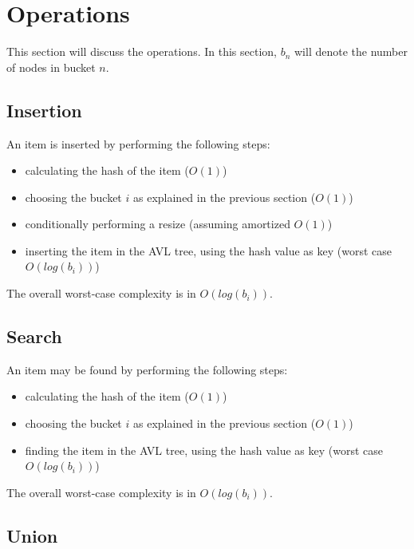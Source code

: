 \section{Operations}

    This section will discuss the operations.
    In this section, $b_n$ will denote the number of nodes in bucket $n$.

    \subsection{Insertion}

        An item is inserted by performing the following steps:
        \begin{itemize}
            \item calculating the hash of the item ($O(1)$)
            \item choosing the bucket $i$ as explained in the previous section
                ($O(1)$)
            \item conditionally performing a resize (assuming amortized $O(1)$)
            \item inserting the item in the AVL tree, using the hash value as
                key (worst case $O(log(b_i))$)
        \end{itemize}
        The overall worst-case complexity is in $O(log(b_i))$.


    \subsection{Search}

        An item may be found by performing the following steps:
        \begin{itemize}
            \item calculating the hash of the item ($O(1)$)
            \item choosing the bucket $i$ as explained in the previous section
                ($O(1)$)
            \item finding the item in the AVL tree, using the hash value as
                key (worst case $O(log(b_i))$)
        \end{itemize}
        The overall worst-case complexity is in $O(log(b_i))$.


    \subsection{Union}

